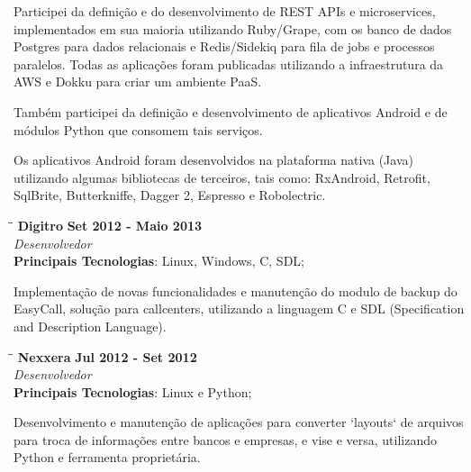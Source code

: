 \documentclass[margin]{res}
\begin{document}
\begin{resume}
Participei da definição e do desenvolvimento de REST APIs e microservices, implementados em sua maioria utilizando Ruby/Grape, com os banco de dados Postgres para dados relacionais e Redis/Sidekiq para fila de jobs e processos paralelos. Todas as aplicações foram publicadas utilizando a infraestrutura da AWS e Dokku para criar um ambiente PaaS.

Também participei da definição e desenvolvimento de aplicativos Android e de módulos Python que consomem tais serviços.

Os aplicativos Android foram desenvolvidos na plataforma nativa (Java) utilizando algumas bibliotecas de terceiros, tais como: RxAndroid, Retrofit, SqlBrite, Butterkniffe, Dagger 2, Espresso e Robolectric.

\vspace{-0.1in}
   \begin{tabbing}
   \hspace{2.3in}\= \hspace{1.7in}\= \kill %
    \textbf{Digitro}    \>\>\textbf{Set 2012 - Maio 2013}\\
    \textit{Desenvolvedor}\\
    \textbf{Principais Tecnologias}: Linux, Windows, C, SDL;
   \end{tabbing}\vspace{-20pt}      %
    \vspace{2mm}
    
    Implementação de novas funcionalidades e manutenção do modulo de backup do EasyCall, solução para callcenters, utilizando a linguagem C e SDL (Specification and Description Language).

   \begin{tabbing}
   \hspace{2.3in}\= \hspace{1.7in}\= \kill %
    \textbf{Nexxera}    \>\>\textbf{Jul 2012 - Set 2012}\\
    \textit{Desenvolvedor}\\
    \textbf{Principais Tecnologias}: Linux e Python;
   \end{tabbing}\vspace{-20pt}      %
    \vspace{2mm}
    Desenvolvimento e manutenção de aplicações para converter `layouts` de arquivos para troca de informações entre bancos e empresas, e vise e versa, utilizando Python e ferramenta proprietária.


\end{resume}
\end{document}
